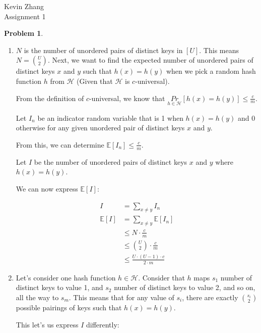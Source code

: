 \documentclass[11pt]{article}
\newcommand{\yourname}{Kevin Zhang}
\theoremstyle{definition}
\theoremstyle{case}
\theoremstyle{theorem}
\newtheorem{prob}{Problem}
\begin{document}
{\large
\noindent \yourname \\
\noindent Assignment 1}


\vspace{15pt}

\begin{prob}\end{prob}

\begin{enumerate}[label=(\alph*)]

\item $N$ is the number of unordered pairs of distinct keys in $[U]$. This means $N = \binom{U}{2}$.
Next, we want to find the expected number of unordered pairs of distinct keys $x$ and $y$ such that $h(x) = h(y)$ when we 
pick a random hash function $h$ from $\mathcal{H}$ (Given that $\mathcal{H}$ is $c$-universal).

From the definition of $c$-universal, we know that $\underset{h \in \mathcal{H}}{Pr}[ h(x) = h(y) ] \leq \frac{c}{m}$.

Let $I_n$ be an indicator random variable that is 1 when $h(x) = h(y)$ and 0 otherwise for any given unordered pair of
distinct keys $x$ and $y$.

From this, we can determine $\mathbb{E}[I_n] \leq \frac{c}{m}$.

Let $I$ be the number of unordered pairs of distinct keys $x$ and $y$ where $h(x) = h(y)$. 

We can now express $\mathbb{E}[I]$:

\begin{align*}
            I &= \sum_{x \neq y}I_n \\
\mathbb{E}[I] &= \sum_{x \neq y}\mathbb{E}[I_n] \\
              &\leq N \cdot \frac{c}{m} \\
              &\leq \binom{U}{2} \cdot \frac{c}{m} \\
              &\leq \frac{U \cdot (U - 1) \cdot c}{2 \cdot m}
\end{align*}

\item Let's consider one hash function $h \in \mathcal{H}$. Consider that $h$ maps $s_1$ number of 
distinct keys to value 1, and $s_2$ number of distinct keys to value 2, and so on, all the way to $s_m$. 
This means that for any value of $s_i$, there are exactly $\binom{s_i}{2}$ possible pairings of keys 
such that $h(x) = h(y)$. 

This let's us express $I$ differently:


\end{enumerate}
\end{document}
